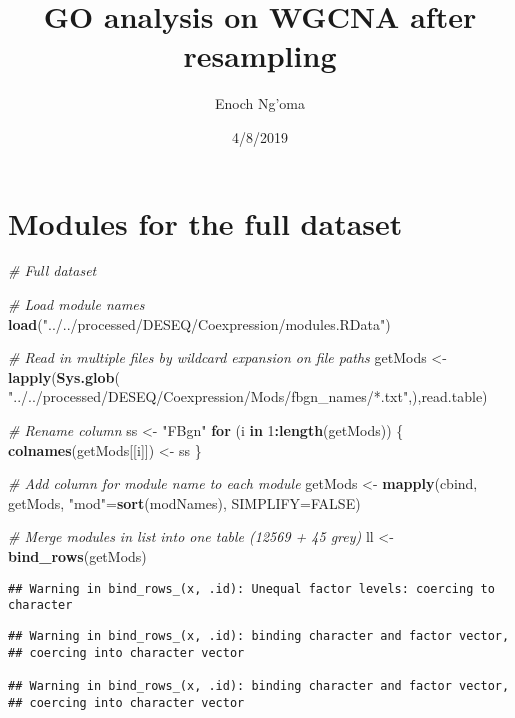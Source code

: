 \documentclass[]{article}
\title{GO analysis on WGCNA after resampling}
\author{Enoch Ng'oma}
\date{4/8/2019}
\newenvironment{Shaded}{\begin{snugshade}}{\end{snugshade}}
\newcommand{\CommentTok}[1]{\textcolor[rgb]{0.56,0.35,0.01}{\textit{#1}}}
\newcommand{\ControlFlowTok}[1]{\textcolor[rgb]{0.13,0.29,0.53}{\textbf{#1}}}
\newcommand{\DataTypeTok}[1]{\textcolor[rgb]{0.13,0.29,0.53}{#1}}
\newcommand{\DecValTok}[1]{\textcolor[rgb]{0.00,0.00,0.81}{#1}}
\newcommand{\KeywordTok}[1]{\textcolor[rgb]{0.13,0.29,0.53}{\textbf{#1}}}
\newcommand{\NormalTok}[1]{#1}
\newcommand{\OperatorTok}[1]{\textcolor[rgb]{0.81,0.36,0.00}{\textbf{#1}}}
\newcommand{\OtherTok}[1]{\textcolor[rgb]{0.56,0.35,0.01}{#1}}
\newcommand{\StringTok}[1]{\textcolor[rgb]{0.31,0.60,0.02}{#1}}
\begin{document}
\maketitle

{
\setcounter{tocdepth}{2}
\tableofcontents
}
\hypertarget{modules-for-the-full-dataset}{%
\section{Modules for the full
dataset}\label{modules-for-the-full-dataset}}

\begin{Shaded}
\begin{Highlighting}[]
\CommentTok{# Full dataset}

\CommentTok{# Load module names}
\KeywordTok{load}\NormalTok{(}\StringTok{"../../processed/DESEQ/Coexpression/modules.RData"}\NormalTok{)}

\CommentTok{# Read in multiple files by wildcard expansion on file paths}
\NormalTok{getMods <-}\StringTok{ }\KeywordTok{lapply}\NormalTok{(}\KeywordTok{Sys.glob}\NormalTok{(}
  \StringTok{"../../processed/DESEQ/Coexpression/Mods/fbgn_names/*.txt"}\NormalTok{,),read.table)}

\CommentTok{# Rename column}
\NormalTok{ss <-}\StringTok{ "FBgn"}
\ControlFlowTok{for}\NormalTok{ (i }\ControlFlowTok{in} \DecValTok{1}\OperatorTok{:}\KeywordTok{length}\NormalTok{(getMods)) \{}
 \KeywordTok{colnames}\NormalTok{(getMods[[i]]) <-}\StringTok{ }\NormalTok{ss }
\NormalTok{\}}

\CommentTok{# Add column for module name to each module}
\NormalTok{getMods <-}\StringTok{ }\KeywordTok{mapply}\NormalTok{(cbind, getMods, }\StringTok{"mod"}\NormalTok{=}\KeywordTok{sort}\NormalTok{(modNames), }
                  \DataTypeTok{SIMPLIFY=}\OtherTok{FALSE}\NormalTok{)}
 
\CommentTok{# Merge modules in list into one table (12569 + 45 grey)}
\NormalTok{ll <-}\StringTok{ }\KeywordTok{bind_rows}\NormalTok{(getMods)}
\end{Highlighting}
\end{Shaded}

\begin{verbatim}
## Warning in bind_rows_(x, .id): Unequal factor levels: coercing to character
\end{verbatim}

\begin{verbatim}
## Warning in bind_rows_(x, .id): binding character and factor vector,
## coercing into character vector

## Warning in bind_rows_(x, .id): binding character and factor vector,
## coercing into character vector
\end{verbatim}
\end{document}
